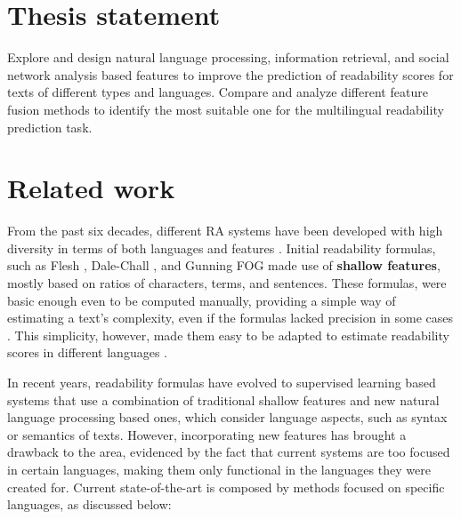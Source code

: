 \documentclass[12pt]{article}
\begin{document}
\section{Thesis statement}

Explore and design natural language processing, information retrieval, and social network analysis based features to improve the prediction of readability scores for texts of different types and languages. Compare and analyze different feature fusion methods to identify the most suitable one for the multilingual readability prediction task.





\section{Related work}
From the past six decades, different RA systems have been developed with high diversity in terms of both languages and features \cite{feng2010comparison,benjamin2012reconstructing}. Initial readability formulas, such as Flesh \cite{flesch1948new}, Dale-Chall \cite{chall1995readability}, and Gunning FOG \cite{albright1996readability} made use of \textbf{shallow features}, mostly based on ratios of characters, terms, and sentences. These formulas, were basic enough even to be computed manually, providing a simple way of estimating a text's complexity, even if the formulas lacked precision in some cases \cite{davison1982failure}. This simplicity, however, made them easy to be adapted to estimate readability scores in different languages \cite{spaulding1956spanish}.

In recent years, readability formulas have evolved to supervised learning based systems that use a combination of traditional shallow features and new natural language processing based ones, which consider language aspects, such as syntax or semantics of texts. However, incorporating  new features has brought a drawback to the area, evidenced by the fact that current systems are too focused in certain languages, making them only functional in the languages they were created for. Current state-of-the-art is composed by methods focused on specific languages, as discussed below:
\end{document}
